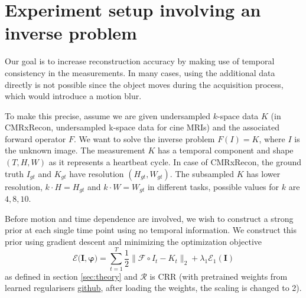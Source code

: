 \documentclass{article}
\begin{document}

\section{Experiment setup involving an inverse problem}

Our goal is to increase reconstruction accuracy by making use of temporal consistency in the measurements.
In many cases, using the additional data directly is not possible since the object moves during the acquisition process, which would introduce a motion blur. 

To make this precise, assume we are given undersampled $k$-space data $K$ (in CMRxRecon, undersampled k-space data for cine MRIs) and the associated forward operator $F$.
We want to solve the inverse problem $F(I) = K$, where $I$ is the unknown image.
The measurement $K$ has a temporal component and shape $(T, H, W)$ as it represents a heartbeat cycle.
In case of CMRxRecon, the ground truth $I_{gt}$ and $K_{gt}$ have resolution $(H_{gt}, W_{gt})$.
The subsampled $K$ has lower resolution, $k\cdot H = H_{gt}$ and $k\cdot W = W_{gt}$ in different tasks, possible values for $k$ are $4, 8, 10$.

Before motion and time dependence are involved, we wish to construct a strong prior at each single time point using no temporal information. We construct this prior using gradient descent and minimizing the optimization objective
\begin{equation}
    \mathcal{E}(\boldsymbol{I}, \boldsymbol{\varphi)} = \sum_{t=1}^T \frac12 \|\mathcal{F}\circ I_t - K_t\|_2 + \lambda_1\mathcal{E}_1(\boldsymbol{I})
\end{equation}
as defined in section \ref{sec:theory} and $\mathcal{R}$ is CRR (with pretrained weights from learned regularisers \href{https://github.com/johertrich/LearnedRegularizers/blob/main/weights/bilevel_CT/CRR_bilevel_JFB_for_CT.pt}{github}, after loading the weights, the scaling is changed to 2).

\end{document}
